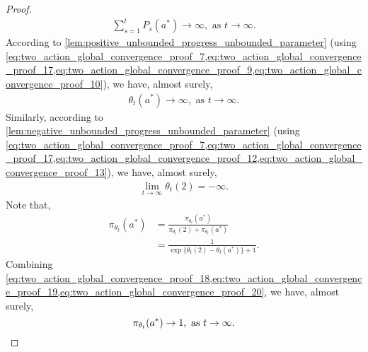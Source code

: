 \begin{proof}
\begin{align}
    \sum_{s=1}^t P_s(a^*) \to \infty, \text{ as } t \to \infty.
\end{align}
According to \cref{lem:positive_unbounded_progress_unbounded_parameter} (using \cref{eq:two_action_global_convergence_proof_7,eq:two_action_global_convergence_proof_17,eq:two_action_global_convergence_proof_9,eq:two_action_global_convergence_proof_10}), we have, almost surely,
\begin{align}
\label{eq:two_action_global_convergence_proof_18}
    \theta_t(a^*) \to \infty, \text{ as } t \to \infty.
\end{align}
Similarly, according to \cref{lem:negative_unbounded_progress_unbounded_parameter} (using \cref{eq:two_action_global_convergence_proof_7,eq:two_action_global_convergence_proof_17,eq:two_action_global_convergence_proof_12,eq:two_action_global_convergence_proof_13}), we have, almost surely,
\begin{align}
\label{eq:two_action_global_convergence_proof_19}
     \lim_{t \to \infty}{ \theta_t(2) } = - \infty.
\end{align}
Note that,
\begin{align}
\label{eq:two_action_global_convergence_proof_20}
    \pi_{\theta_t}(a^*)
    &= \frac{\pi_{\theta_t}(a^*)}{ \pi_{\theta_t}(2) +  \pi_{\theta_t}(a^*)} \\
    &= \frac{1}{ \exp\{ \theta_t(2) - \theta_t(a^*) \} + 1}.
\end{align}
Combining \cref{eq:two_action_global_convergence_proof_18,eq:two_action_global_convergence_proof_19,eq:two_action_global_convergence_proof_20}, we have, almost surely,
\begin{equation*}
    \pi_{\theta_t}(a^*) \to 1, \text{ as } t \to \infty. \qedhere
\end{equation*}
\end{proof}

